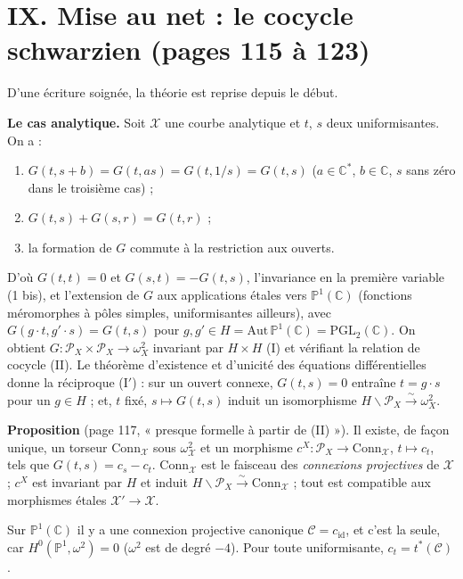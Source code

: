 \documentclass[11pt,a4paper]{article}
\begin{document}
\section*{IX. Mise au net : le cocycle schwarzien (pages 115 à 123)}

D'une écriture soignée, la théorie est reprise depuis le début.

\textbf{Le cas analytique.} Soit $\mathcal{X}$ une courbe analytique et $t$, $s$
deux uniformisantes. On a :
\begin{enumerate}
  \item[(1)] $G(t, s + b) = G(t, as) = G(t, 1/s) = G(t,s)$ ($a \in
  \mathbb{C}^*$, $b \in \mathbb{C}$, $s$ sans zéro dans le troisième cas) ;
  \item[(2)] $G(t,s) + G(s,r) = G(t,r)$ ;
  \item[(3)] la formation de $G$ commute à la restriction aux ouverts.
\end{enumerate}
D'où $G(t,t) = 0$ et $G(s,t) = -G(t,s)$, l'invariance en la première variable
(1 bis), et l'extension de $G$ aux applications étales vers
$\mathbb{P}^1(\mathbb{C})$ (fonctions méromorphes à pôles simples, uniformisantes
ailleurs), avec $G(g\cdot t, g'\cdot s) = G(t,s)$ pour $g, g' \in H =
\mathrm{Aut}\,\mathbb{P}^1(\mathbb{C}) = \mathrm{PGL}_2(\mathbb{C})$. On obtient
$G : \mathcal{P}_X \times \mathcal{P}_X \to \omega_X^2$ invariant par $H \times H$
(I) et vérifiant la relation de cocycle (II). Le théorème d'existence et
d'unicité des équations différentielles donne la réciproque (I$'$) : sur un
ouvert connexe, $G(t,s) = 0$ entraîne $t = g \cdot s$ pour un $g \in H$ ; et,
$t$ fixé, $s \mapsto G(t,s)$ induit un isomorphisme
$H\backslash\mathcal{P}_X \xrightarrow{\sim} \omega_X^2$.

\textbf{Proposition} (page 117, « presque formelle à partir de (II) »). Il
existe, de façon unique, un torseur $\mathrm{Conn}_{\mathcal{X}}$ sous
$\omega^2_{\mathcal{X}}$ et un morphisme $c^X : \mathcal{P}_X \to
\mathrm{Conn}_{\mathcal{X}}$, $t \mapsto c_t$, tels que $G(t,s) = c_s - c_t$.
$\mathrm{Conn}_{\mathcal{X}}$ est le faisceau des \emph{connexions projectives}
de $\mathcal{X}$ ; $c^X$ est invariant par $H$ et induit
$H\backslash\mathcal{P}_X \xrightarrow{\sim} \mathrm{Conn}_{\mathcal{X}}$ ; tout est
compatible aux morphismes étales $\mathcal{X}' \to \mathcal{X}$.

Sur $\mathbb{P}^1(\mathbb{C})$ il y a une connexion projective canonique
$\mathcal{C} = c_{\mathrm{id}}$, et c'est la seule, car
$H^0(\mathbb{P}^1, \omega^2) = 0$ ($\omega^2$ est de degré $-4$). Pour toute
uniformisante, $c_t = t^*(\mathcal{C})$.
\end{document}
